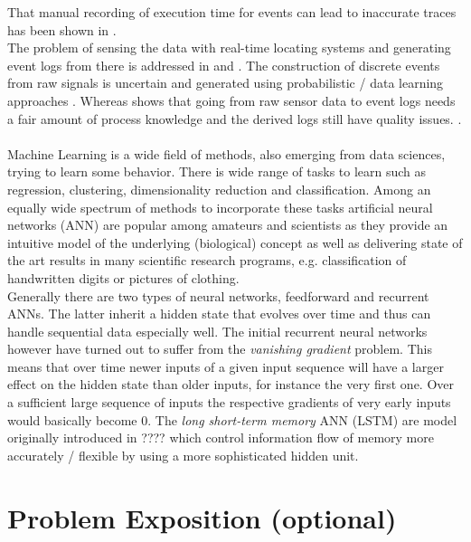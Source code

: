 \documentclass[
	a4paper,
	pagesize,
	pdftex,
	12pt,
	ngerman,
	fleqn,
	final,
	]{scrartcl}
\theoremstyle{plain}
\theoremstyle{definition}
\begin{document}
	That manual recording of execution time for events can lead to inaccurate traces has been shown in \cite{lu2014conformance}. \\
	The problem of sensing the data with real-time locating systems and generating event logs from there is addressed in \cite{tran2009probabilistic} and \cite{senderovich2016road}. The construction of discrete events from raw signals is uncertain and generated using probabilistic / data learning approaches \cite{tran2009probabilistic}. Whereas \cite{senderovich2016road} shows that going from raw sensor data to event logs needs a fair amount of process knowledge and the derived logs still have quality issues. .\\ 
	\\
	Machine Learning is a wide field of methods, also emerging from data sciences, trying to learn some behavior. There is wide range of tasks to learn such as regression, clustering,  dimensionality reduction and classification. Among an equally wide spectrum of methods to incorporate these tasks artificial neural networks (ANN) are popular among amateurs and scientists as they provide an intuitive model of the underlying (biological) concept as well as delivering state of the art results in many scientific research programs, e.g. classification of handwritten digits or pictures of clothing. \\
	Generally there are two types of neural networks, feedforward and recurrent ANNs. The latter inherit a hidden state that evolves over time and thus can handle sequential data especially well. The initial recurrent neural networks however have turned out to suffer from the \textit{vanishing gradient} problem. This means that over time newer inputs of a given input sequence will have a larger effect on the hidden state than older inputs, for instance the very first one. Over a sufficient large sequence of inputs the respective gradients of very early inputs would basically become 0. The \textit{long short-term memory} ANN (LSTM) are model originally introduced in ???? which control information flow of memory more accurately / flexible by using a more sophisticated hidden unit. 

	
\section{Problem Exposition (optional)}
	
\end{document}
